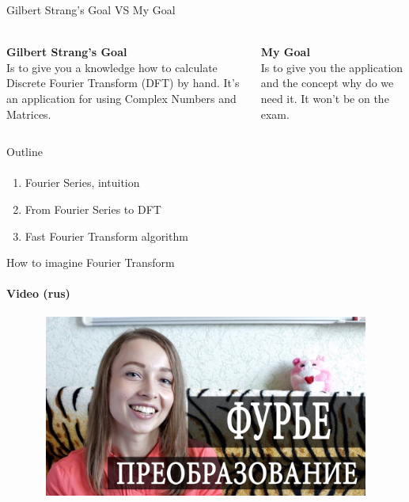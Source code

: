 \documentclass[aspectratio=169]{beamer}
\begin{document}
\begin{frame}[t]{Gilbert Strang's Goal VS My Goal}
\framesubtitle{}
\Large
    \begin{columns}[T,onlytextwidth]
        \begin{column}{0.49\textwidth}
            \textbf{Gilbert Strang's Goal} \\
            Is to give you a knowledge how to calculate Discrete Fourier Transform (DFT) by hand. It's an application for using Complex Numbers and Matrices.
        \end{column}
        \begin{column}{0.49\textwidth}
            \textbf{My Goal} \\ 
            Is to give you the application and the concept why do we need it. It won't be on the exam.
        \end{column}
    \end{columns}
\end{frame}


\begin{frame}[t]{Outline}
\framesubtitle{}
    \Large
    \begin{enumerate}
        \item Fourier Series, intuition
        \item From Fourier Series to DFT
        \item Fast Fourier Transform algorithm
    \end{enumerate}
\end{frame}

\begin{frame}[t]{How to imagine Fourier Transform}
    \framesubtitle{Video (rus)}
    \vspace{-0.6cm}
    \begin{figure}[H]
        \href{https://youtu.be/Vaa1BVGhpxI}{
            \centering\includegraphics[height=6cm,width=1\textwidth,keepaspectratio]{wdwnfourier_rus.jpg}}
        \label{fig:file_name}
    \end{figure}
\end{frame}
\end{document}
